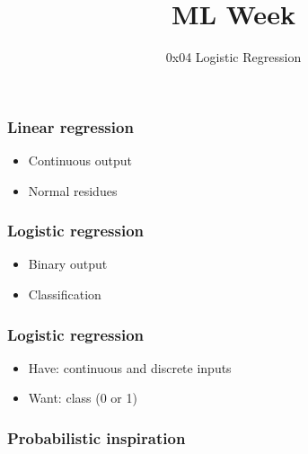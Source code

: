 
\title
{ML Week}
\subtitle{0x04 \hspace{2mm}  Logistic Regression}




\begin{frame}
  \titlepage
\end{frame}


\begin{frame}
  \frametitle{Linear regression}
  \begin{bphrase}
    \begin{itemize}
    \item Continuous output
    \item Normal residues
    \end{itemize}
  \end{bphrase}
\end{frame}

\begin{frame}
  \frametitle{Logistic regression}
  \begin{bphrase}
    \begin{itemize}
    \item Binary output
    \item Classification
    \end{itemize}
  \end{bphrase}
\end{frame}

\begin{frame}
  \frametitle{Logistic regression}
  \begin{itemize}
  \item Have: continuous and discrete inputs
  \item Want: class (0 or 1)
  \end{itemize}
\end{frame}

\begin{frame}
  \frametitle{Probabilistic inspiration}

\end{frame}

